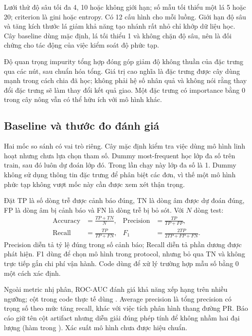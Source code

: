 Lưới thử độ sâu tối đa 4, 10 hoặc không giới hạn; số mẫu tối thiểu một lá
5 hoặc 20; criterion là gini hoặc entropy. Có 12 cấu hình cho mỗi luồng.
Giới hạn độ sâu và tăng kích thước lá giảm khả năng tạo nhánh rất nhỏ chỉ
khớp dữ liệu học. Cây baseline dùng mặc định, lá tối thiểu 1 và không chặn
độ sâu, nên là đối chứng cho tác động của việc kiểm soát độ phức tạp.

Độ quan trọng impurity tổng hợp đóng góp giảm độ không thuần của đặc trưng
qua các nút, sau chuẩn hóa tổng. Giá trị cao nghĩa là đặc trưng được cây
dùng mạnh trong cách chia đã học; không phải hệ số nhân quả và không nói
rằng thay đổi đặc trưng sẽ làm thay đổi kết quả giao. Một đặc trưng có
importance bằng 0 trong cây nông vẫn có thể hữu ích với mô hình khác.

\subsection{Baseline và thước đo đánh giá}
Hai mốc so sánh có vai trò riêng. Cây mặc định kiểm tra việc dùng mô hình
linh hoạt nhưng chưa lựa chọn tham số. Dummy most-frequent học lớp đa số
trên train, sau đó luôn dự đoán lớp đó. Trong lần chạy này lớp đa số là 1.
Dummy không sử dụng thông tin đặc trưng để phân biệt các đơn, vì thế một
mô hình phức tạp không vượt mốc này cần được xem xét thận trọng.

Đặt TP là số dòng trễ được cảnh báo đúng, TN là dòng âm được dự đoán đúng,
FP là dòng âm bị cảnh báo và FN là dòng trễ bị bỏ sót. Với $N$ dòng test:
\begin{align}
\mathrm{Accuracy}&=\frac{TP+TN}{N},&
\mathrm{Precision}&=\frac{TP}{TP+FP},\\
\mathrm{Recall}&=\frac{TP}{TP+FN},&
F_1&=\frac{2TP}{2TP+FP+FN}.
\end{align}
Precision diễn tả tỷ lệ đúng trong số cảnh báo; Recall diễn tả phần dương
được phát hiện. F1 dùng để chọn mô hình trong protocol, nhưng bỏ qua TN và
không trực tiếp gắn chi phí vận hành. Code dùng 
để xử lý trường hợp mẫu số bằng 0 một cách xác định.

Ngoài metric nhị phân, ROC-AUC đánh giá khả năng xếp hạng trên nhiều ngưỡng;
cột  trong code thực tế dùng .
Average precision là tổng precision có trọng số theo mức tăng recall,
khác với việc tích phân hình thang đường PR. Báo cáo giữ tên cột artifact
nhưng diễn giải đúng phép tính để không nhầm hai đại lượng (hàm  trong ).
Xác suất mô hình chưa được hiệu chuẩn.

